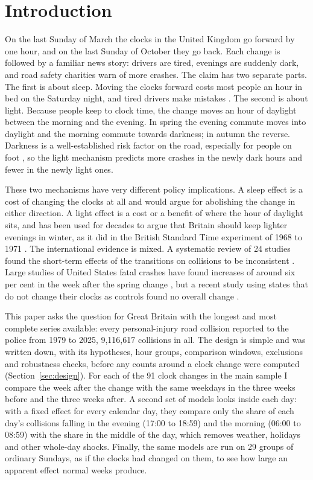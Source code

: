 \documentclass[11pt,a4paper]{article}
\begin{document}
\section{Introduction}\label{sec:intro}
On the last Sunday of March the clocks in the United Kingdom go forward by one hour, and on the last Sunday of October they go back. Each change is followed by a familiar news story: drivers are tired, evenings are suddenly dark, and road safety charities warn of more crashes. The claim has two separate parts. The first is about sleep. Moving the clocks forward costs most people an hour in bed on the Saturday night, and tired drivers make mistakes \citep{harrison2013,kantermann2007}. The second is about light. Because people keep to clock time, the change moves an hour of daylight between the morning and the evening. In spring the evening commute moves into daylight and the morning commute towards darkness; in autumn the reverse. Darkness is a well-established risk factor on the road, especially for people on foot \citep{plainis2006,sullivan2007,uttley2017aap}, so the light mechanism predicts more crashes in the newly dark hours and fewer in the newly light ones.

These two mechanisms have very different policy implications. A sleep effect is a cost of changing the clocks at all and would argue for abolishing the change in either direction. A light effect is a cost or a benefit of where the hour of daylight sits, and has been used for decades to argue that Britain should keep lighter evenings in winter, as it did in the British Standard Time experiment of 1968 to 1971 \citep{homeoffice1970,broughton1999}. The international evidence is mixed. A systematic review of 24 studies found the short-term effects of the transitions on collisions to be inconsistent \citep{carey2017}. Large studies of United States fatal crashes have found increases of around six per cent in the week after the spring change \citep{smith2016,fritz2020}, but a recent study using states that do not change their clocks as controls found no overall change \citep{lei2026}.

This paper asks the question for Great Britain with the longest and most complete series available: every personal-injury road collision reported to the police from 1979 to 2025, 9,116,617 collisions in all. The design is simple and was written down, with its hypotheses, hour groups, comparison windows, exclusions and robustness checks, before any counts around a clock change were computed (Section~\ref{sec:design}). For each of the 91 clock changes in the main sample I compare the week after the change with the same weekdays in the three weeks before and the three weeks after. A second set of models looks inside each day: with a fixed effect for every calendar day, they compare only the share of each day's collisions falling in the evening (17:00 to 18:59) and the morning (06:00 to 08:59) with the share in the middle of the day, which removes weather, holidays and other whole-day shocks. Finally, the same models are run on 29 groups of ordinary Sundays, as if the clocks had changed on them, to see how large an apparent effect normal weeks produce.
\end{document}
